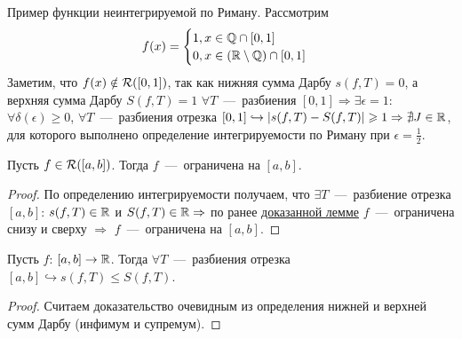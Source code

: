 \begin{example}%
    Пример функции неинтегрируемой по Риману. Рассмотрим 
    $$
    f(x) = 
    \begin{cases}
        1, x \in \mathbb{Q} \cap [0, 1] \\ 
        0, x \in \left(\mathbb{R} \setminus \mathbb{Q} \right)\cap [0, 1]
    \end{cases}
    $$
    Заметим, что $f(x) \notin \mathcal{R}([0, 1])$, так как нижняя сумма Дарбу $s (f, T) = 0$, а верхняя сумма Дарбу $S (f, T) = 1$ $\forall T$~---~разбиения $[0, 1] \Rightarrow \exists \epsilon = 1$: $\forall \delta(\epsilon) \geq 0$, $\forall T$~---~разбиения отрезка $[0, 1] \hookrightarrow |s(f, T) - S(f, T)| \geqslant 1 \Rightarrow \nexists J \in \mathbb{R}$, для которого выполнено определение интегрируемости по Риману при $\epsilon = \frac{1}{2}.$
\end{example}

\begin{theorem}
    Пусть $f \in \mathcal{R}([a, b])$. Тогда $f$~---~ограничена на $[a, b]$.
\end{theorem}

\begin{proof}
    По определению интегрируемости получаем, что $\exists T$~---~разбиение отрезка $[a, b]$: $s(f, T) \in \mathbb{R}$ и $S(f, T) \in \mathbb{R} \Rightarrow$ по ранее \hyperlink{lemma12.1}{доказанной лемме} $f$~---~ограничена снизу и сверху $\Rightarrow$ $f$~---~ограничена на $[a, b]$.
\end{proof}

\begin{lemma}
    Пусть $f$: $[a, b] \rightarrow \mathbb{R}$. Тогда $\forall T$~---~разбиения отрезка $[a, b] \hookrightarrow s(f, T) \leq S(f, T)$.
\end{lemma}

\begin{proof}
    Считаем доказательство очевидным из определения нижней и верхней сумм Дарбу (инфимум и супремум).
\end{proof}


